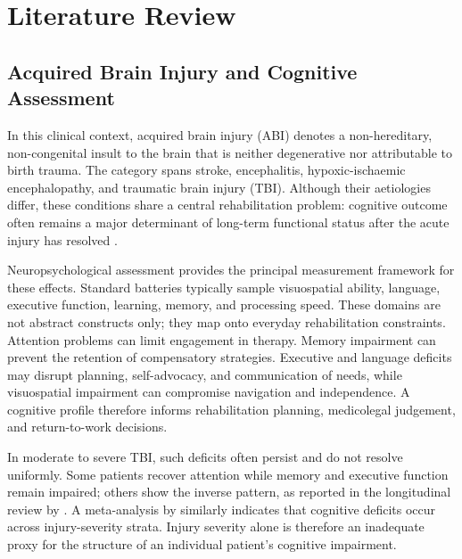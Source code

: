 
\chapter{Literature Review}\label{Chapter2}


\section{Acquired Brain Injury and Cognitive Assessment}

In this clinical context, acquired brain injury (ABI) denotes a non-hereditary, non-congenital insult to the brain that is neither degenerative nor attributable to birth trauma. The category spans stroke, encephalitis, hypoxic-ischaemic encephalopathy, and traumatic brain injury (TBI). Although their aetiologies differ, these conditions share a central rehabilitation problem: cognitive outcome often remains a major determinant of long-term functional status after the acute injury has resolved \parencite{lezak2012neuropsychological, ponsford2008functional}.

Neuropsychological assessment provides the principal measurement framework for these effects. Standard batteries typically sample visuospatial ability, language, executive function, learning, memory, and processing speed. These domains are not abstract constructs only; they map onto everyday rehabilitation constraints. Attention problems can limit engagement in therapy. Memory impairment can prevent the retention of compensatory strategies. Executive and language deficits may disrupt planning, self-advocacy, and communication of needs, while visuospatial impairment can compromise navigation and independence. A cognitive profile therefore informs rehabilitation planning, medicolegal judgement, and return-to-work decisions.

In moderate to severe TBI, such deficits often persist and do not resolve uniformly. Some patients recover attention while memory and executive function remain impaired; others show the inverse pattern, as reported in the longitudinal review by \textcite{ponsford2014longitudinal}. A meta-analysis by \textcite{rabinowitz2014neuropsychological} similarly indicates that cognitive deficits occur across injury-severity strata. Injury severity alone is therefore an inadequate proxy for the structure of an individual patient's cognitive impairment.

